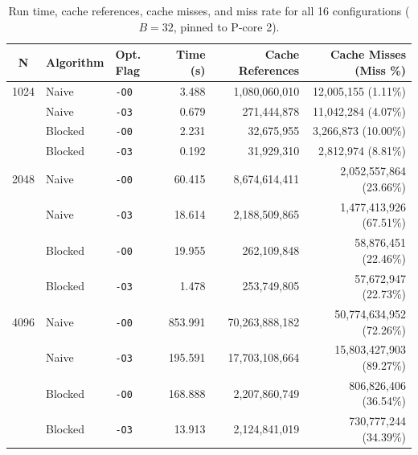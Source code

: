 \documentclass[10pt,a4paper]{article}
\begin{document}
\begin{table}[h!]
\centering
\small
\setlength{\tabcolsep}{6pt}
\renewcommand{\arraystretch}{1.15}

\caption{Run time, cache references, cache misses, and miss rate for all 16 configurations ($B=32$, pinned to P-core 2).}

\begin{tabular}{c l l r r r}

\toprule
\rowcolor{headerblue}
\color{white}\textbf{N} &
\color{white}\textbf{Algorithm} &
\color{white}\textbf{Opt. Flag} &
\color{white}\textbf{Time (s)} &
\color{white}\textbf{Cache References} &
\color{white}\textbf{Cache Misses (Miss \%)} \\

\midrule

1024 & Naive   & \texttt{-O0} & 3.488  & 1,080,060,010 & 12,005,155 (1.11\%) \\
     & Naive   & \texttt{-O3} & 0.679  &   271,444,878 & 11,042,284 (4.07\%) \\
\rowcolor{rowgray}
     & Blocked & \texttt{-O0} & 2.231  &    32,675,955 &  3,266,873 (10.00\%) \\
\rowcolor{rowgray}
     & Blocked & \texttt{-O3} & 0.192  &    31,929,310 &  2,812,974 (8.81\%) \\

\midrule

2048 & Naive   & \texttt{-O0} & 60.415  & 8,674,614,411 & 2,052,557,864 (23.66\%) \\
     & Naive   & \texttt{-O3} & 18.614  & 2,188,509,865 & 1,477,413,926 (67.51\%) \\
\rowcolor{rowgray}
     & Blocked & \texttt{-O0} & 19.955  &   262,109,848 &    58,876,451 (22.46\%) \\
\rowcolor{rowgray}
     & Blocked & \texttt{-O3} & 1.478   &   253,749,805 &    57,672,947 (22.73\%) \\

\midrule

4096 & Naive   & \texttt{-O0} & 853.991  & 70,263,888,182 & 50,774,634,952 (72.26\%) \\
     & Naive   & \texttt{-O3} & 195.591  & 17,703,108,664 & 15,803,427,903 (89.27\%) \\
\rowcolor{rowgray}
     & Blocked & \texttt{-O0} & 168.888  &  2,207,860,749 &    806,826,406 (36.54\%) \\
\rowcolor{rowgray}
     & Blocked & \texttt{-O3} & 13.913   &  2,124,841,019 &    730,777,244 (34.39\%) \\


\end{tabular}
\end{table}
\end{document}
